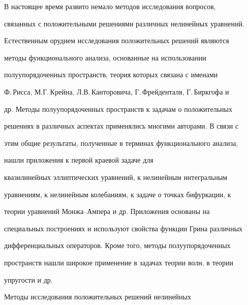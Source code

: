 \pagestyle{plain} %


 




\maketitle 


\label{begin} 


 


 


В настоящее время развито немало методов исследования вопросов, 


связанных с положительными решениями различных нелинейных уравнений. 


Естественным орудием исследования положительных решений являются 


методы функционального анализа, основанные на использовании 


полуупорядоченных пространств, теория которых связана с именами 


Ф.\,Рисса, М.Г.\,Крейна, Л.В.\,Канторовича, Г.\,Фрейденталя, Г.\,Биркгофа и 


др. Методы полуупорядоченных пространств к задачам о положительных 


решениях в различных аспектах применялись многими авторами. В связи с 


этим общие результаты, полученные в терминах функционального анализа, 


нашли приложения к первой краевой задаче для 


квазилинейных эллиптических уравнений, к нелинейным интегральным 


уравнениям, к нелинейным колебаниям, к задаче о точках бифуркации, к 


теории уравнений Монжа--Ампера и др. Приложения основаны на 


специальных построениях и используют свойства функции Грина различных 


дифференциальных операторов. Кроме того, методы полуупорядоченных 


пространств нашли широкое применение в задачах теории волн, в теории 


упругости и др. 


 


Методы исследования положительных решений нелинейных 


